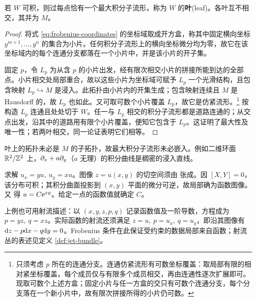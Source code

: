 \begin{theorem}[最大积分子流形]
    若 $W$ 可积，则过每点恰有一个最大积分子流形，称为 $W$ 的\textbf{叶}(leaf)。各叶互不相交，其并为 $M$。
\end{theorem}
\begin{proof}
    将式 \eqref{eq:frobenius-coordinates} 的坐标域取成开方盒，称其中固定横向坐标 $y^{m+1},\ldots,y^n$ 的集合为小片。任何积分子流形上的横向坐标微分均为零，故它在该坐标域内的每个连通分支都落在一个小片中，并是该小片的开子集。

    固定 $p$，令 $L_p$ 为从含 $p$ 的小片出发，经有限次相交小片的拼接所能到达的全部点。小片相交处局部重合，故以这些小片为坐标域可赋予 $L_p$ 一个光滑结构，且包含映射 $L_p\hookrightarrow M$ 是浸入。此拓扑由小片内的开集生成；包含映射连续且 $M$ 是 Hausdorff 的，故 $L_p$ 也如此。又可取可数个小片覆盖 $L_p$，故它是仿紧流形。\footnote{只须考虑 $p$ 所在的连通分支。连通仿紧流形有可数坐标覆盖：取局部有限的相对紧坐标覆盖，每个成员仅与有限多个成员相交，再由连通性逐次扩展即可。现取可数个上述方盒；固定小片与任一方盒的交只有可数个连通分支，每个分支落在一个新小片中，故有限次拼接所得的小片仍可数。}
    按构造 $L_p$ 连通且处处切于 $W$。任一与 $L_p$ 相交的积分子流形都是道路连通的；从交点出发，沿其中的道路用有限个小片覆盖，便知它包含于 $L_p$。这证明了最大性及唯一性；若两叶相交，同一论证表明它们相等。
\end{proof}

\begin{remark}
    叶上的拓扑未必是 $M$ 的子拓扑，故最大积分子流形未必嵌入。例如二维环面 $\mathbb{R}^2/\mathbb{Z}^2$ 上，$\partial_x+a\partial_y$（$a$ 无理）的积分曲线是稠密的浸入直线。
\end{remark}

\begin{example}[一阶偏微分方程组]
    求解 $u_x=yu,\ u_y=xu$。图像 $z=u(x,y)$ 的切空间须由
    张成。因 $[X,Y]=0$，该分布可积；其积分曲面投影到 $(x,y)$ 平面的微分可逆，故局部确为函数图像。又
    得 $u=C\mathrm{e}^{xy}$。给定一点的函数值就确定 $C$。
\end{example}

\begin{remark}
    上例也可用射流描述：以 $(x,y,z,p,q)$ 记录函数值及一阶导数，方程成为 $p=yz,\ q=xz$。实际函数的射流还须满足 $z=u,\ p=u_x,\ q=u_y$，即沿其图像有 $\dd z-p\dd x-q\dd y=0$。Frobenius 条件在此保证受约束的数据局部来自函数；射流丛的表述见定义 \ref{def:jet-bundle}。
\end{remark}


